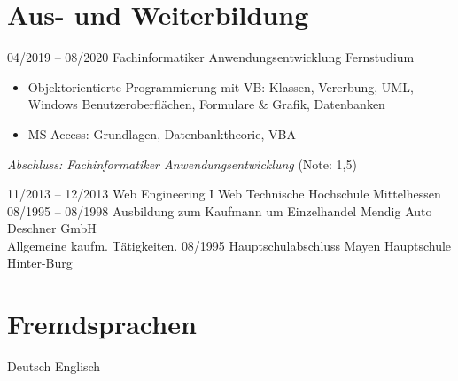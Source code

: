 \documentclass[a4paper]{friggeri-cv} %
\begin{document}

\section{Aus- und Weiterbildung}

\begin{entrylist}
\entry
{04/2019 -- 08/2020}
{Fachinformatiker Anwendungsentwicklung}
{Fernstudium}
{\begin{itemize}
        \item Objektorientierte Programmierung mit VB: Klassen, Vererbung, UML, Windows Benutzeroberflächen, Formulare \& Grafik, Datenbanken
        \item MS Access: Grundlagen, Datenbanktheorie, VBA
    \end{itemize}
{\emph{Abschluss: Fachinformatiker Anwendungsentwicklung} (Note: 1,5)}
}
\newline
\entry
{11/2013 -- 12/2013}
{Web Engineering I}
{Web}
{Technische Hochschule Mittelhessen}
\entry
{08/1995 -- 08/1998}
{Ausbildung zum Kaufmann um Einzelhandel}
{Mendig}
{Auto Deschner GmbH\\
Allgemeine kaufm. Tätigkeiten.
}
\entry
{08/1995}
{Hauptschulabschluss}
{Mayen}
{Hauptschule Hinter-Burg}
\end{entrylist}
\newpage

\section{Fremdsprachen}
Deutsch 
Englisch 
\end{document}
